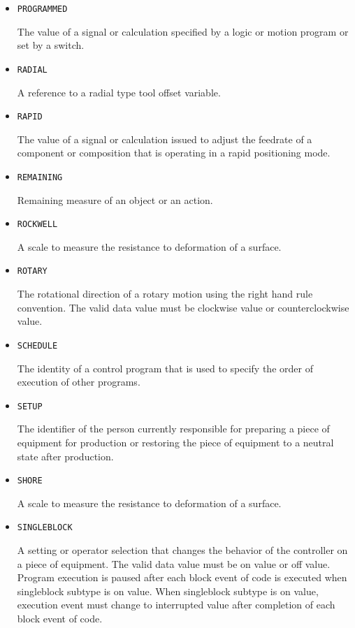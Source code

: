 \begin{itemize}
\item \texttt{PROGRAMMED}  

The value of a signal or calculation specified by a logic or motion program or set by a switch.


\item \texttt{RADIAL}  

A reference to a radial type tool offset variable.


\item \texttt{RAPID}  

The value of a signal or calculation issued to adjust the feedrate of a component or composition that is operating in a rapid positioning mode.


\item \texttt{REMAINING}  

Remaining measure of an object or an action.


\item \texttt{ROCKWELL}  

A scale to measure the resistance to deformation of a surface.


\item \texttt{ROTARY}  

The rotational direction of a rotary motion using the right hand rule convention.
 The valid data value must be clockwise value or counterclockwise value.


\item \texttt{SCHEDULE}  

The identity of a control program that is used to specify the order of execution of other programs.


\item \texttt{SET\textunderscore UP}  

The identifier of the person currently responsible for preparing a piece of equipment for production or restoring the piece of equipment to a neutral state after production.


\item \texttt{SHORE}  

A scale to measure the resistance to deformation of a surface.


\item \texttt{SINGLE\textunderscore BLOCK}  

A setting or operator selection that changes the behavior of the controller on a piece of equipment. 
 The valid data value must be on value or off value.
 Program execution is paused after each block event of code is executed when singleblock subtype is on value.   
 When singleblock subtype is on value, execution event must change to interrupted value after completion of each block event of code. 



\end{itemize}
